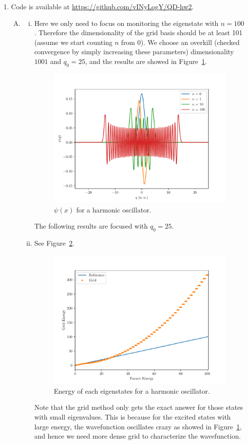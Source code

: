 \documentclass{article}
\begin{document}
\begin{enumerate}[1.]
  \item Code is available at \url{https://github.com/vINyLogY/QD-hw2}.
  \begin{enumerate}[(A)]
    \item
    \begin{enumerate}[(i)]
      \item Here we only need to focus on monitoring the eigenstate with $n = 100$. Therefore the dimensionality of the grid basis should be at least 101 (assume we start counting $n$ from $0$).  We choose an overkill (checked convergence by simply increasing these parameters) dimensionality $1001$ and $q_0 = 25$, and the results are showed in Figure~\ref{fig:q6a-1}.
      \begin{figure}[H]
        \centering
        \includegraphics[width=0.6\linewidth]{q6a-1.pdf}
        \caption{$\psi(x)$ for a harmonic oscillator.}
        \label{fig:q6a-1}
      \end{figure}
      The following results are focused with $q_0 = 25$.

      \item See Figure~\ref{fig:q6a-2}.
      \begin{figure}[H]
        \centering
        \includegraphics[width=0.6\linewidth]{q6a-2.pdf}
        \caption{Energy of each eigenstates for a harmonic oscillator.}
        \label{fig:q6a-2}
      \end{figure}
      Note that the grid method only gets the exact answer for those states with small eigenvalues. This is because for the excited states with large energy, the wavefunction oscillates crazy as showed in Figure~\ref{fig:q6a-1}, and hence we need more dense grid to characterize the wavefunction.  
      

\end{enumerate}
\end{enumerate}
\end{enumerate}
\end{document}
